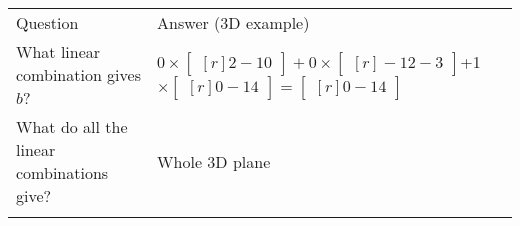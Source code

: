 \documentclass[../main.tex]{subfiles}
\begin{document}
\begin{multicols*}{4}
{    \begin{tabular}{@{}ll@{}} \trule
        \textrm{Question}                         & \textrm{Answer (3D example)} \\ \mrule
        What linear combination gives $b$?        & \makecell[tl]{
            $
                0 \times
                \begin{bmatrix*}[r]
                    2 \\
                    -1 \\
                    0
                \end{bmatrix*}
                +
                0 \times
                \begin{bmatrix*}[r]
                    -1 \\
                    2 \\
                    -3
                \end{bmatrix*}
                \\ $+$
            $1$ \times
                \begin{bmatrix*}[r]
                    0 \\
                    -1 \\
                    4
                \end{bmatrix*}
                =
                \begin{bmatrix*}[r]
                    0 \\
                    -1 \\
                    4
                \end{bmatrix*}
            $
        }                                                                        \\
        What do all the linear combinations give? & Whole 3D plane               \\ \brule
    \end{tabular}
}

\sectionboxnew{
}
\end{multicols*}
\end{document}
